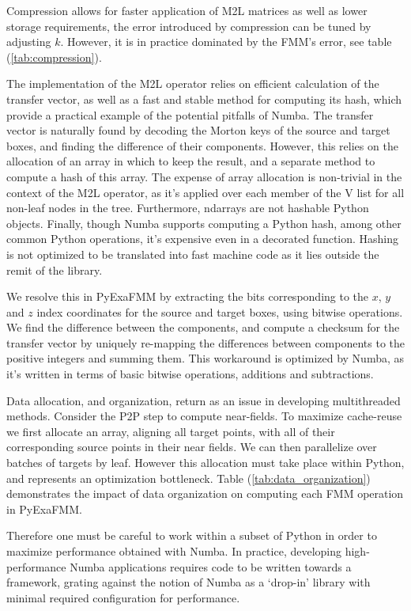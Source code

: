 \documentclass{IEEEcsmag}
\begin{document}
Compression allows for faster application of M2L matrices as well as lower storage requirements, the error introduced by compression can be tuned by adjusting $k$. However, it is in practice dominated by the FMM's error, see table (\ref{tab:compression}).

The implementation of the M2L operator relies on efficient calculation of the transfer vector, as well as a fast and stable method for computing its hash, which provide a practical example of the potential pitfalls of Numba. The transfer vector is naturally found by decoding the Morton keys of the source and target boxes, and finding the difference of their components. However, this relies on the allocation of an array in which to keep the result, and a separate method to compute a hash of this array. The expense of array allocation is non-trivial in the context of the M2L operator, as it's applied over each member of the V list for all non-leaf nodes in the tree. Furthermore, ndarrays are not hashable Python objects. Finally, though Numba supports computing a Python hash, among other common Python operations, it's expensive even in a decorated function. Hashing is not optimized to be translated into fast machine code as it lies outside the remit of the library.

We resolve this in PyExaFMM by extracting the bits corresponding to the $x$, $y$ and $z$ index coordinates for the source and target boxes, using bitwise operations. We find the difference between the components, and compute a checksum for the transfer vector by uniquely re-mapping the differences between components to the positive integers and summing them. This workaround is optimized by Numba, as it's written in terms of basic bitwise operations, additions and subtractions.

Data allocation, and organization, return as an issue in developing multithreaded methods. Consider the P2P step to compute near-fields. To maximize cache-reuse we first allocate an array, aligning all target points, with all of their corresponding source points in their near fields. We can then parallelize over batches of targets by leaf. However this allocation must take place within Python, and represents an optimization bottleneck. Table (\ref{tab:data_organization}) demonstrates the impact of data organization on computing each FMM operation in PyExaFMM.

Therefore one must be careful to work within a subset of Python in order to maximize performance obtained with Numba. In practice, developing high-performance Numba applications requires code to be written towards a framework, grating against the notion of Numba as a `drop-in' library with minimal required configuration for performance.
\end{document}
